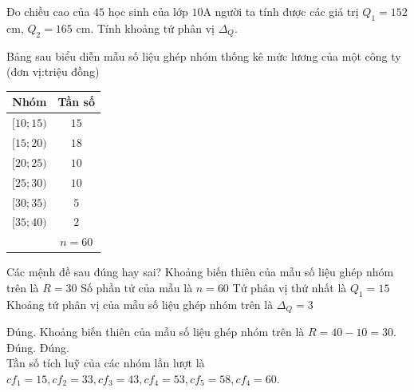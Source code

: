 \begin{bt}%
Đo chiều cao của $45$ học sinh của lớp $10$A người ta tính được các giá trị $Q_1=152$ cm, $Q_2=165$ cm. Tính khoảng tứ phân vị $\Delta _Q$.
\end{bt}

\begin{ex}%
	Bảng sau biểu diễn mẫu số liệu ghép nhóm thống kê mức lương của một công ty (đơn vị:triệu đồng)
	\begin{center}
		\begin{tabular}{|c|c|}
			\hline Nhóm & Tần số \\
			\hline$[10 ; 15)$ & $15$ \\
			\hline$[15 ; 20)$ & $18$ \\
			\hline$[20 ; 25)$ & $10$ \\
			\hline$[25 ; 30)$ & $10$ \\
			\hline$[30 ; 35)$ & $5$ \\
			\hline$[35 ; 40)$ & $2$ \\
			\hline & $n=60$ \\
			\hline
		\end{tabular}
	\end{center}
	Các mệnh đề sau đúng hay sai?
	\choiceTF
	{\True Khoảng biến thiên của mẫu số liệu ghép nhóm trên là $R=30$}
	{\True Số phần tử của mẫu là $n=60$}
	{\True Tứ phân vị thứ nhất là $Q_1=15$}
	{ Khoảng tứ phân vị của mẫu số liệu ghép nhóm trên là $\Delta_Q=3$}
	\loigiai
	{
		\begin{itemchoice}
			\itemch Đúng. Khoảng biến thiên của mẫu số liệu ghép nhóm trên là $R=40-10=30$.
			\itemch Đúng. 
			\itemch Đúng. \\
			Tần số tích luỹ của các nhóm lần lượt là $c f_1=15, c f_2=33, c f_3=43, c f_4=53, c f_5=58, c f_4=60$.\\

\end{itemchoice}}
\end{ex}
